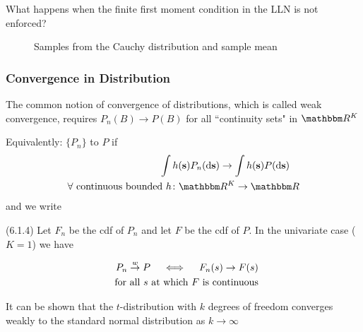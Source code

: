\begin{frame}

    \vspace{2em}
    What happens when the finite first
    moment condition in the LLN is not enforced?
    
\end{frame}

\begin{frame}

    \vspace{2em}
    \begin{figure}
    \centering
    \caption{\label{f:cauchy_samples} Samples from the Cauchy distribution and sample mean}
    
\end{figure}

\end{frame}

\begin{frame}\frametitle{Convergence in Distribution}

    \vspace{2em}
    The common notion of convergence of distributions, which is
    called weak convergence, requires $P_n(B) \to P(B)$ for all
    ``continuity sets" in $\RR^K$
    
    \vspace{1em}
    Equivalently: $\{P_n\}$  to $P$ if
    \begin{align*}
        \int h(\bolds) P_n(\diff \bolds) \to \int h(\bolds) P(\diff \bolds)
        \quad 
        \\ \text{$\forall$ continuous bounded $h \colon \RR^K \to \RR$}
    \end{align*}
    and we write 
    
\end{frame}

\begin{frame}

    \vspace{2em}
    \Fact(6.1.4)
    Let $F_n$ be the {\sc cdf} of $P_n$ and let $F$ be the {\sc cdf} of $P$.
    In the univariate case ($K=1$) we have 
    
    \begin{align*}
        P_n \stackrel { w } {\to} P 
        \quad \iff \quad
        F_n(s) \to F(s) 
        \\ \; \text{ for all $s$ at which $F$ is continuous}
    \end{align*}

    \vspace{1em}
    \Eg
        It can be shown that the $t$-distribution with $k$ degrees of freedom
        converges weakly to the standard normal distribution as $k \to \infty$
    
\end{frame}

